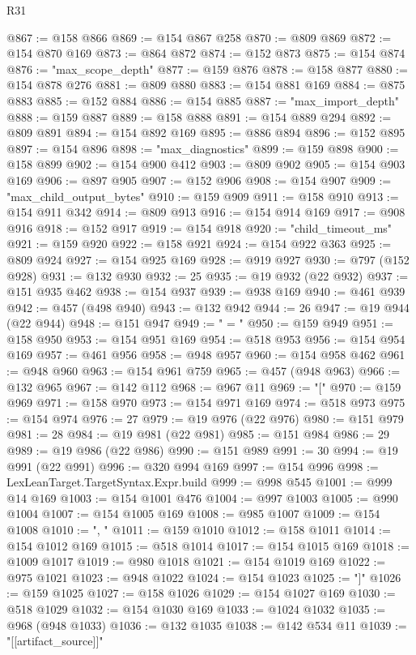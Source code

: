 \begin{lexlean}{R31}
\begin{coremodule}
@867 := @158 @866
@869 := @154 @867 @258
@870 := @809 @869
@872 := @154 @870 @169
@873 := @864 @872
@874 := @152 @873
@875 := @154 @874
@876 := "max_scope_depth"
@877 := @159 @876
@878 := @158 @877
@880 := @154 @878 @276
@881 := @809 @880
@883 := @154 @881 @169
@884 := @875 @883
@885 := @152 @884
@886 := @154 @885
@887 := "max_import_depth"
@888 := @159 @887
@889 := @158 @888
@891 := @154 @889 @294
@892 := @809 @891
@894 := @154 @892 @169
@895 := @886 @894
@896 := @152 @895
@897 := @154 @896
@898 := "max_diagnostics"
@899 := @159 @898
@900 := @158 @899
@902 := @154 @900 @412
@903 := @809 @902
@905 := @154 @903 @169
@906 := @897 @905
@907 := @152 @906
@908 := @154 @907
@909 := "max_child_output_bytes"
@910 := @159 @909
@911 := @158 @910
@913 := @154 @911 @342
@914 := @809 @913
@916 := @154 @914 @169
@917 := @908 @916
@918 := @152 @917
@919 := @154 @918
@920 := "child_timeout_ms"
@921 := @159 @920
@922 := @158 @921
@924 := @154 @922 @363
@925 := @809 @924
@927 := @154 @925 @169
@928 := @919 @927
@930 := @797 (@152 @928)
@931 := @132 @930
@932 := 25
@935 := @19 @932 (@22 @932)
@937 := @151 @935 @462
@938 := @154 @937
@939 := @938 @169
@940 := @461 @939
@942 := @457 (@498 @940)
@943 := @132 @942
@944 := 26
@947 := @19 @944 (@22 @944)
@948 := @151 @947
@949 := " = "
@950 := @159 @949
@951 := @158 @950
@953 := @154 @951 @169
@954 := @518 @953
@956 := @154 @954 @169
@957 := @461 @956
@958 := @948 @957
@960 := @154 @958 @462
@961 := @948 @960
@963 := @154 @961 @759
@965 := @457 (@948 @963)
@966 := @132 @965
@967 := @142 @112
@968 := @967 @11
@969 := "["
@970 := @159 @969
@971 := @158 @970
@973 := @154 @971 @169
@974 := @518 @973
@975 := @154 @974
@976 := 27
@979 := @19 @976 (@22 @976)
@980 := @151 @979
@981 := 28
@984 := @19 @981 (@22 @981)
@985 := @151 @984
@986 := 29
@989 := @19 @986 (@22 @986)
@990 := @151 @989
@991 := 30
@994 := @19 @991 (@22 @991)
@996 := @320 @994 @169
@997 := @154 @996
@998 := LexLeanTarget.TargetSyntax.Expr.build
@999 := @998 @545
@1001 := @999 @14 @169
@1003 := @154 @1001 @476
@1004 := @997 @1003
@1005 := @990 @1004
@1007 := @154 @1005 @169
@1008 := @985 @1007
@1009 := @154 @1008
@1010 := ", "
@1011 := @159 @1010
@1012 := @158 @1011
@1014 := @154 @1012 @169
@1015 := @518 @1014
@1017 := @154 @1015 @169
@1018 := @1009 @1017
@1019 := @980 @1018
@1021 := @154 @1019 @169
@1022 := @975 @1021
@1023 := @948 @1022
@1024 := @154 @1023
@1025 := "]"
@1026 := @159 @1025
@1027 := @158 @1026
@1029 := @154 @1027 @169
@1030 := @518 @1029
@1032 := @154 @1030 @169
@1033 := @1024 @1032
@1035 := @968 (@948 @1033)
@1036 := @132 @1035
@1038 := @142 @534 @11
@1039 := "[[artifact_source]]"

\end{coremodule}
\end{lexlean}
